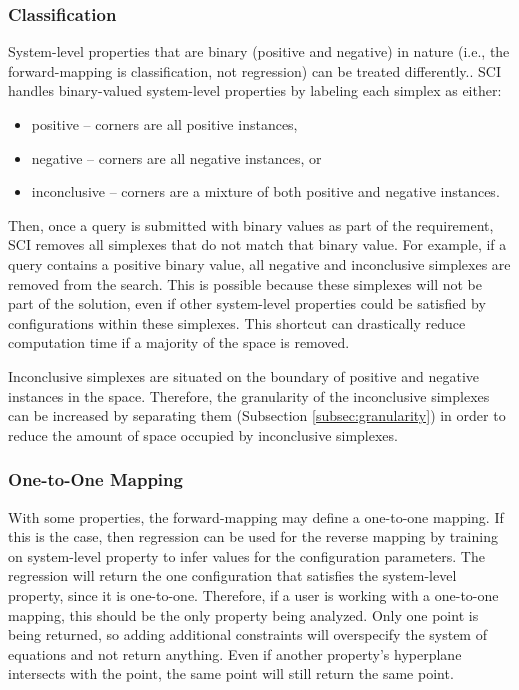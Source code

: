    \subsubsection{Classification}
System-level properties that are binary (positive and negative) in nature (i.e., the forward-mapping is classification, not regression) can be treated differently..
SCI handles binary-valued system-level properties by labeling each simplex as either:
\begin{itemize}
\item positive -- corners are all positive instances,
\item negative -- corners are all negative instances, or
\item inconclusive -- corners are a mixture of both positive and negative instances.
\end{itemize}
Then, once a query is submitted with binary values as part of the requirement, SCI removes all simplexes that do not match that binary value.
For example, if a query contains a positive binary value, all negative and inconclusive simplexes are removed from the search.
This is possible because these simplexes will not be part of the solution, even if other system-level properties could be satisfied by configurations within these simplexes.
This shortcut can drastically reduce computation time if a majority of the space is removed.

Inconclusive simplexes are situated on the boundary of positive and negative instances in the space.
Therefore, the granularity of the inconclusive simplexes can be increased by separating them (Subsection \ref{subsec:granularity}) in order to reduce the amount of space occupied by inconclusive simplexes.


   \subsubsection{One-to-One Mapping}
With some properties, the forward-mapping may define a one-to-one mapping.
If this is the case, then regression can be used for the reverse mapping by training on system-level property to infer values for the configuration parameters.
The regression will return the one configuration that satisfies the system-level property, since it is one-to-one.
Therefore, if a user is working with a one-to-one mapping, this should be the only property being analyzed.
Only one point is being returned, so adding additional constraints will overspecify the system of equations and not return anything.
Even if another property's hyperplane intersects with the point, the same point will still return the same point.

